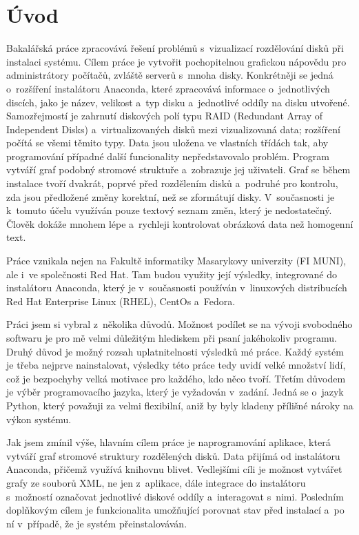 \documentclass[color,table,oneside,nolot,nolof]{fithesis}
\begin{document}
\chapter{Úvod}
	Bakalářská práce zpracovává řešení problémů s~vizualizací rozdělování disků při instalaci systému. Cílem práce je vytvořit pochopitelnou grafickou nápovědu pro administrátory 
	počítačů, zvláště serverů s~mnoha disky. 
	Konkrétněji se jedná o~rozšíření instalátoru Anaconda, které zpracovává informace o~jednotlivých discích, jako je název, velikost a~typ disku a~jednotlivé oddíly na disku utvořené. 
	Samozřejmostí je zahrnutí 
	diskových polí typu RAID (Redundant Array of Independent Disks)  a~virtualizovaných disků mezi vizualizovaná data; rozšíření počítá se všemi těmito typy. Data jsou uložena 
	ve vlastních třídách tak, aby programování případné další funcionality 
	nepředstavovalo problém. Program vytváří graf podobný stromové struktuře a~zobrazuje jej uživateli. Graf se během instalace tvoří dvakrát, poprvé
	před rozdělením disků a~podruhé pro kontrolu, zda jsou předložené změny korektní, než se zformátují disky. V~současnosti je k~tomuto účelu využíván pouze textový 
	seznam změn, který je nedostatečný. Člověk dokáže mnohem lépe a~rychleji kontrolovat obrázková data než homogenní text. 

	Práce vznikala nejen na Fakultě informatiky Masarykovy univerzity (FI MUNI), ale i~ve společnosti Red Hat. Tam budou využity její výsledky,
	integrované do instalátoru Anaconda, který je v~současnosti používán v~linuxových distribucích Red Hat Enterprise Linux (RHEL), CentOs a~Fedora.

	Práci jsem si vybral z~několika důvodů.  Možnost podílet se na vývoji svobodného softwaru je pro mě velmi důležitým hlediskem 
	při psaní jakéhokoliv programu. Druhý důvod je možný rozsah uplatnitelnosti výsledků mé práce. Každý systém je třeba nejprve nainstalovat, výsledky
	této práce tedy uvidí velké množství lidí, což je bezpochyby velká motivace pro každého, kdo něco tvoří. Třetím důvodem je výběr programovacího jazyka, který je vyžadován 
	v~zadání. Jedná se o~jazyk Python, který považuji za velmi flexibilní, aniž by byly kladeny přílišné nároky na výkon systému. 

	Jak jsem zmínil výše, hlavním cílem práce je naprogramování aplikace, která vytváří graf stromové struktury rozdělených disků. Data přijímá od instalátoru Anaconda, 
	přičemž využívá knihovnu blivet. 
	Vedlejšími cíli je možnost vytvářet grafy ze souborů XML, ne jen z~aplikace, dále integrace do instalátoru s~možností označovat jednotlivé diskové oddíly a~interagovat
	s~nimi. Posledním doplňkovým cílem je funkcionalita umožňující porovnat stav před instalací a~po ní v~případě, že je systém přeinstalováván.
\end{document}
